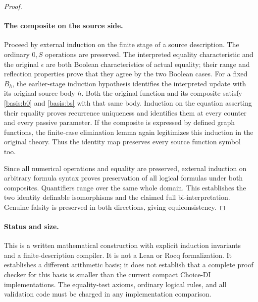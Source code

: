 \begin{proof}
\paragraph{The composite on the source side.}
Proceed by external induction on the finite stage of a source
description.  The ordinary $0,S$ operations are preserved.
The interpreted equality characteristic and the original $\epsilon$
are both Boolean characteristics of actual equality; their range and
reflection properties prove that they agree by the two Boolean cases.
For a fixed $B_h$, the earlier-stage induction hypothesis identifies
the interpreted update with its original source body $h$.  Both the
original function and its composite satisfy
\eqref{basis:b0} and \eqref{basis:bs} with that same body.  Induction
on the equation asserting their equality proves recurrence uniqueness
and identifies them at every counter and every passive parameter.
If the composite is expressed by defined graph functions, the
finite-case elimination lemma again legitimizes this induction in
the original theory.  Thus the identity map preserves every source
function symbol too.

Since all numerical operations and equality are preserved, external
induction on arbitrary formula syntax proves preservation of all
logical formulas under both composites.  Quantifiers range over the
same whole domain.  This establishes the two identity definable
isomorphisms and the claimed full bi-interpretation.  Genuine falsity
is preserved in both directions, giving equiconsistency.
\end{proof}

\paragraph{Status and size.}
This is a written mathematical construction with explicit induction
invariants and a finite-description compiler.  It is not a Lean or
Rocq formalization.  It establishes a different arithmetic basis;
it does not establish that a complete proof checker for this basis is
smaller than the current compact Choice-DI implementations.  The
equality-test axioms, ordinary logical rules, and all validation code
must be charged in any implementation comparison.

